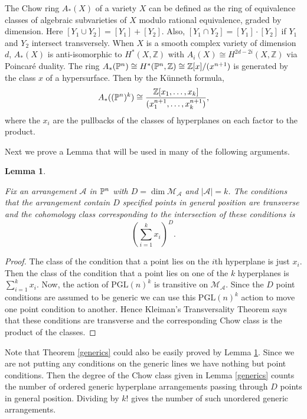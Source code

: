 \documentclass[12pt]{article}
\theoremstyle{plain}
\newtheorem{lemma}[theorem]{Lemma}
\theoremstyle{definition}
\newcommand{\A}{\mathcal{A}}
\newcommand{\M}{\mathcal{M}}
\newcommand{\Z}{\mathbb{Z}}
\renewcommand{\P}{\ensuremath \mathbb{P}}
\begin{document}
The Chow ring $A_*(X)$ of a variety $X$ can be defined as the ring of equivalence classes of algebraic subvarieties of $X$ modulo rational equivalence, graded by dimension. Here $[Y_1 \cup Y_2] = [Y_1] + [Y_2]$. Also, $[Y_1 \cap Y_2] = [Y_1]\cdot [Y_2]$ if $Y_1$ and $Y_2$ intersect transversely. When $X$ is a smooth complex variety of dimension $d$, $A_*(X)$ is anti-isomorphic to $H^*(X,\Z)$ with $A_i(X) \cong H^{2d-2i}(X,\Z)$ via Poincar\'e duality. The ring  $A_*(\P^n) \cong H^*(\P^n,\mathbb{Z}) \cong \mathbb{Z}[x]/(x^{n+1})$ is generated by the class $x$ of a hypersurface. Then by the K\"unneth formula, $$A_*((\P^n)^k) \cong \frac{\mathbb{Z}[x_1,\ldots,x_k]}{(x_1^{n+1},\ldots,x_k^{n+1})},$$ where the $x_i$ are the pullbacks of the classes of hyperplanes on each factor to the product. 

Next we prove a Lemma that will be used in many of the following arguments.

\begin{lemma}\label{transpts}

Fix an arrangement $\A$ in $\P^n$ with $D=\dim \M_\A$ and $|\A|=k$. The conditions that the arrangement contain $D$ specified points in general position are transverse and the cohomology class corresponding to the intersection of these conditions is$$\left(\sum_{i=1}^kx_i\right)^D.$$ 

\end{lemma}

\begin{proof} The class of the condition that a point lies on the $i$th hyperplane is just $x_i$. Then the class of the condition that a point lies on one of the $k$ hyperplanes is $\sum_{i=1}^kx_i$. Now, the action of $\mathrm{PGL}(n)^k$  is transitive on $\M_\A$. Since the $D$ point conditions are assumed to be generic we can use this $\mathrm{PGL}(n)^k$ action to move one point condition to another. Hence Kleiman's Transversality Theorem \cite{Kleiman} says that these conditions are transverse and the corresponding Chow class is the product of the classes. \end{proof}

Note that Theorem \ref{generics} could also be easily proved by Lemma \ref{transpts}. Since we are not putting any conditions on the generic lines we have nothing but point conditions. Then the degree of the Chow class given in Lemma \ref{generics} counts the number of ordered generic hyperplane arrangements passing through $D$ points in general position. Dividing by $k!$ gives the number of such unordered generic arrangements.
\end{document}

